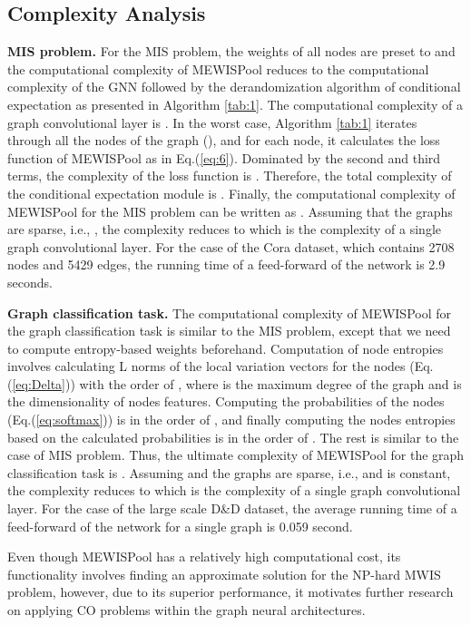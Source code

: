 \documentclass{article}
\begin{document}
\subsection{Complexity Analysis}\label{subsec:ca}


\textbf{MIS problem.} For the MIS problem, the weights of all nodes are preset to  and the computational complexity of MEWISPool reduces to the computational complexity of the GNN followed by the derandomization algorithm of conditional expectation as presented in Algorithm \ref{tab:1}. The computational complexity of a graph convolutional layer is  \cite{structpool}. In the worst case, Algorithm \ref{tab:1} iterates through all the nodes of the graph (), and for each node, it calculates the loss function of MEWISPool as in Eq.(\ref{eq:6}).
Dominated by the second and third terms, the complexity of the loss function is . Therefore, the total complexity of the conditional expectation module is . Finally, the computational complexity of MEWISPool for the MIS problem can be written as . Assuming that the graphs are sparse, i.e., , the complexity reduces to  which is the complexity of a single graph convolutional layer. For the case of the Cora dataset, which contains 2708 nodes and 5429 edges, the running time of a feed-forward of the network is 2.9 seconds.

\textbf{Graph classification task.} 
The computational complexity of MEWISPool for the graph classification task is similar to the MIS problem, except that we need to compute entropy-based weights beforehand. Computation of node entropies involves calculating L norms of the local variation vectors for the nodes (Eq.(\ref{eq:Delta})) with the order of , where  is the maximum degree of the graph and  is the dimensionality of nodes features.
Computing the probabilities of the nodes (Eq.(\ref{eq:softmax})) is in the order of , and finally computing the nodes entropies based on the calculated probabilities is in the order of . The rest is similar to the case of MIS problem. Thus, the ultimate complexity of MEWISPool for the graph classification task is . Assuming  and the graphs are sparse, i.e.,  and  is constant, the complexity reduces to  which is the complexity of a single graph convolutional layer. For the case of the large scale D\&D dataset, the average running time of a feed-forward of the network for a single graph is 0.059 second.

Even though MEWISPool has a relatively high computational cost, its functionality involves finding an approximate solution for the NP-hard MWIS problem, however, due to its superior performance, it motivates further research on applying CO problems within the graph neural architectures.
\end{document}
